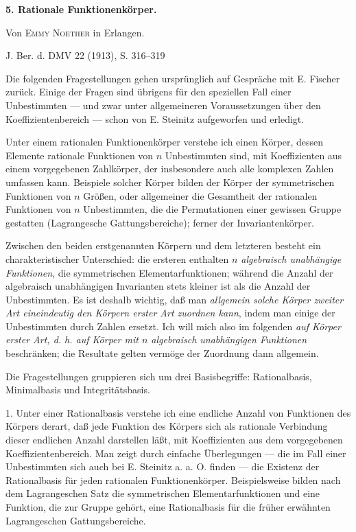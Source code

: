 \begin{center}
{\Large\bfseries 5. Rationale Funktionenkörper.}\par
\vspace{1.2em}
Von \textsc{Emmy Noether} in Erlangen.\par
\medskip
J. Ber. d. DMV 22 (1913), S. 316--319
\end{center}

\vspace{2em}

Die folgenden Fragestellungen gehen ursprünglich auf Gespräche mit E. Fischer zurück. Einige der Fragen sind übrigens für den speziellen Fall einer Unbestimmten --- und zwar unter allgemeineren Voraussetzungen über den Koeffizientenbereich --- schon von E. Steinitz aufgeworfen und erledigt.

Unter einem \glqq{}rationalen Funktionenkörper\grqq{} verstehe ich einen Körper, dessen Elemente rationale Funktionen von $n$ Unbestimmten sind, mit Koeffizienten aus einem vorgegebenen Zahlkörper, der insbesondere auch alle komplexen Zahlen umfassen kann. Beispiele solcher Körper bilden der Körper der symmetrischen Funktionen von $n$ Größen, oder allgemeiner die Gesamtheit der rationalen Funktionen von $n$ Unbestimmten, die die Permutationen einer gewissen Gruppe gestatten (Lagrangesche Gattungsbereiche); ferner der Invariantenkörper.

Zwischen den beiden erstgenannten Körpern und dem letzteren besteht ein charakteristischer Unterschied: die ersteren enthalten \emph{$n$ algebraisch unabhängige Funktionen}, die symmetrischen Elementarfunktionen; während die Anzahl der algebraisch unabhängigen Invarianten stets kleiner ist als die Anzahl der Unbestimmten. Es ist deshalb wichtig, daß man \emph{allgemein solche Körper zweiter Art eineindeutig den Körpern erster Art zuordnen kann}, indem man einige der Unbestimmten durch Zahlen ersetzt. Ich will mich also im folgenden \emph{auf Körper erster Art, d. h. auf Körper mit $n$ algebraisch unabhängigen Funktionen} beschränken; die Resultate gelten vermöge der Zuordnung dann allgemein.

Die Fragestellungen gruppieren sich um drei Basisbegriffe: Rationalbasis, Minimalbasis und Integritätsbasis.

1. Unter einer \glqq{}Rationalbasis\grqq{} verstehe ich eine endliche Anzahl von Funktionen des Körpers derart, daß jede Funktion des Körpers sich als rationale Verbindung dieser endlichen Anzahl darstellen läßt, mit Koeffizienten aus dem vorgegebenen Koeffizientenbereich. Man zeigt durch einfache Überlegungen --- die im Fall einer Unbestimmten sich auch bei E. Steinitz a. a. O. finden --- die Existenz der Rationalbasis für jeden rationalen Funktionenkörper. Beispielsweise bilden nach dem Lagrangeschen Satz die symmetrischen Elementarfunktionen und eine Funktion, die zur Gruppe gehört, eine Rationalbasis für die früher erwähnten Lagrangeschen Gattungsbereiche.

